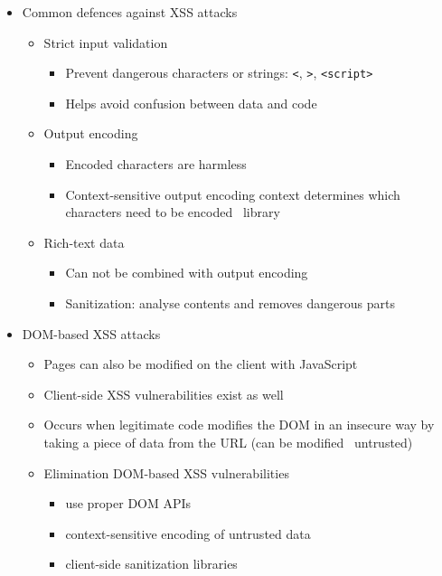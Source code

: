 \documentclass[12pt,titlepage,a4paper]{report}
\begin{document}
\begin{itemize}
		\item Common defences against XSS attacks
		\begin{itemize}
			\item Strict input validation
			\begin{itemize}
				\item Prevent dangerous characters or strings: \texttt{<}, \texttt{>}, \texttt{<script>}
				\item Helps avoid confusion between data and code
			\end{itemize}
			\item Output encoding
			\begin{itemize}
				\item Encoded characters are harmless
				\item Context-sensitive output encoding
					\subitem context determines which characters need to be encoded \textrightarrow \ library
			\end{itemize}
			\item Rich-text data
			\begin{itemize}
				\item Can not be combined with output encoding
				\item Sanitization: analyse contents and removes dangerous parts
			\end{itemize}
		\end{itemize}
	
		\item DOM-based XSS attacks
		\begin{itemize}
			\item Pages can also be modified on the client with JavaScript
			\item Client-side XSS vulnerabilities exist as well
			\item Occurs when legitimate code modifies the DOM in an insecure way
				\subitem by taking a piece of data from the URL (can be modified \textrightarrow \ untrusted)
			\item Elimination DOM-based XSS vulnerabilities
			\begin{itemize}
				\item use proper DOM APIs
				\item context-sensitive encoding of untrusted data
				\item client-side sanitization libraries
			\end{itemize}
		\end{itemize}
	\end{itemize}
\end{document}
